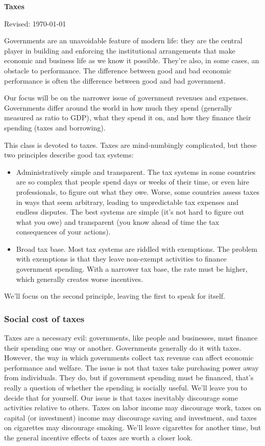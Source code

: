 \documentclass[letterpaper,12pt]{article}
\def\HeadName{Taxes}
\begin{document}
\thispagestyle{empty}%
\Head

\centerline{\large \bf \HeadName}%
\centerline{Revised: \today}

\bigskip
Governments are an unavoidable feature of modern life:
they are the central player in building and enforcing
the institutional arrangements that make economic
and business life as we know it possible.
They're also, in some cases, an obstacle to performance.
The difference between good and bad economic performance
is often the difference between good and bad government.

Our focus will be on the narrower issue of government revenues and expenses.
Governments differ around the world
in how much they spend (generally measured as  ratio to GDP),
what they spend it on,
and how they finance their spending (taxes and borrowing).

This class is devoted to taxes.
Taxes are mind-numbingly complicated, but these two principles
describe good tax systems:
%
\begin{itemize}

\item Administratively simple and transparent.
The tax systems in some countries are so complex that people spend
days or weeks of their time, or even hire professionals, to figure out
what they owe.
Worse, some countries assess taxes in ways that seem arbitrary,
leading to unpredictable tax expenses and endless disputes.
The best systems are simple (it's not hard to figure out what you owe)
and transparent (you know ahead of time the tax consequences of your actions).

\item Broad tax base.
Most tax systems are riddled with exemptions.  The problem with exemptions is that they leave non-exempt activities to finance government spending. With a narrower tax base, the rate must be higher, which generally creates worse incentives.
\end{itemize}
%
We'll focus on the second principle, leaving the first to speak for itself.


\subsubsection*{Social cost of taxes}

Taxes are a necessary evil:
governments, like people and businesses,
must finance their spending one way or another.
Governments generally do it with taxes.
However, the way in which governments collect tax revenue
can affect economic performance and welfare.
The issue is not that taxes take purchasing power
away from individuals.  
They do, but if government spending must be financed,
that's really a question of whether the spending is socially useful.
We'll leave you to decide that for yourself.
Our issue is that taxes inevitably
discourage some activities relative to others.
Taxes on labor income may discourage work,
taxes on capital (or investment) income may discourage saving and investment,
and taxes on cigarettes may discourage smoking.
We'll leave cigarettes for another time,
but the general incentive effects of taxes are worth a closer look.
\end{document}
